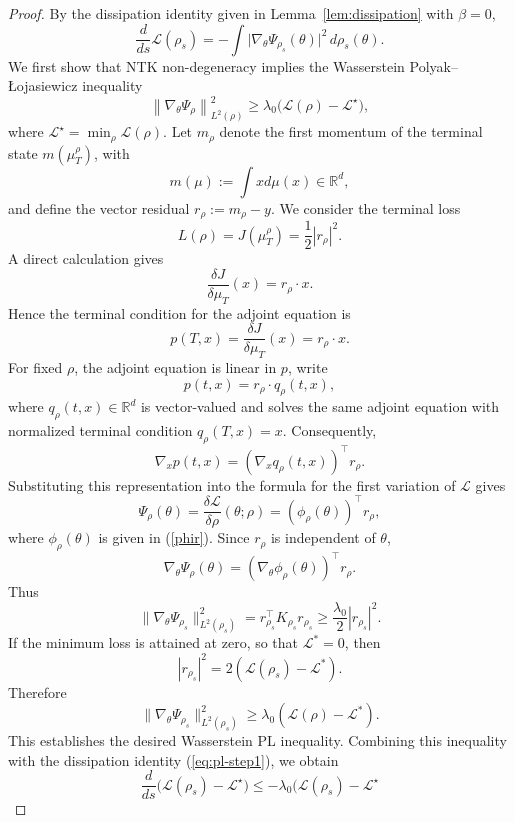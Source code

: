 \documentclass[10pt,a4paper]{amsart}
\begin{document}
\begin{proof}
By the dissipation identity given in Lemma~\ref{lem:dissipation}  with $\beta=0$, 
\begin{equation}
\frac{d}{ds}\mathcal L(\rho_s)
=
-
\int 
\bigl|
\nabla_\theta\Psi_{\rho_s}(\theta)
\bigr|^2
\,d\rho_s(\theta).
\label{eq:pl-step1}
\end{equation}
We first show that NTK non-degeneracy  implies the Wasserstein Polyak–Łojasiewicz 
inequality 
\[
\left\|\nabla_\theta \Psi_\rho\right\|_{L^2(\rho)}^2
\ge \lambda_0
\bigl(
\mathcal L(\rho)
-
\mathcal L^\star
\bigr),
\]
where
\(
\mathcal L^\star
=
\min_\rho\mathcal L(\rho).
\)
Let $m_\rho$ denote the first momentum of the terminal state $m(\mu_T^\rho)$, with 
$$
m(\mu):=\int x d\mu(x) \in \mathbb{R}^d, 
$$
and define the  vector residual 
$r_\rho:=m_\rho - y$. We consider the terminal loss  
$$
L(\rho)=J(\mu_T^\rho)=\frac{1}{2}|r_\rho|^2. 
$$
A direct calculation gives  
$$
\frac{\delta J}{\delta \mu_T}(x)= r_\rho \cdot x. 
$$
Hence the terminal condition for the adjoint equation is 
 $$
 p(T, x)=\frac{\delta J}{\delta \mu_T}(x)= r_\rho \cdot x.
 $$ 
 For fixed $\rho$, the adjoint equation is linear in $p$, write  
$$
p(t, x)=r_\rho \cdot q_\rho(t, x), 
$$
where $q_\rho(t, x)\in \mathbb{R}^d$ is vector-valued and solves the same adjoint equation with normalized terminal condition $q_\rho(T, x)=x$. Consequently,  
$$
\nabla_x p(t, x)=( \nabla_x q_\rho(t, x))^\top r_\rho. 
$$
Substituting this representation into the formula for the first variation of $\mathcal L$ gives
$$
\Psi_\rho(\theta)=\frac{\delta \mathcal L}{\delta \rho}(\theta; \rho)= (\phi_\rho(\theta))^\top r_\rho,
$$
where 
$
\phi_\rho(\theta)
$
is given in (\ref{phir}).  Since $r_\rho$ is independent of $\theta$,
$$
\nabla_\theta \Psi_\rho(\theta)=(\nabla_\theta \phi_\rho(\theta))^\top r_\rho. 
$$
Thus 
$$
\|\nabla_\theta \Psi_{\rho_s}\|^2_{L^2(\rho_s)}= r_{\rho_s}^\top K_{\rho_s} r_{\rho_s}  \geq \frac{\lambda_0}{2} |r_{\rho_s}|^2. 
$$
If the minimum loss is attained at zero, so that $\mathcal L^*=0$, then 
$$
|r_{\rho_s}|^2= 2( \mathcal L(\rho_s)-\mathcal L^*). 
$$
Therefore 
$$
\|\nabla_\theta \Psi_{\rho_s}\|^2_{L^2(\rho_s)} \geq  \lambda_0  (\mathcal L(\rho)-\mathcal L^* ). 
$$
This establishes the desired Wasserstein PL inequality. Combining this inequality with the dissipation identity (\ref{eq:pl-step1}), we obtain  
\[
\frac{d}{ds}
\bigl(
\mathcal L(\rho_s)-\mathcal L^\star
\bigr)
\le
-
\lambda_0
\bigl(
\mathcal L(\rho_s)-\mathcal L^\star
\]
\end{proof}
\end{document}
